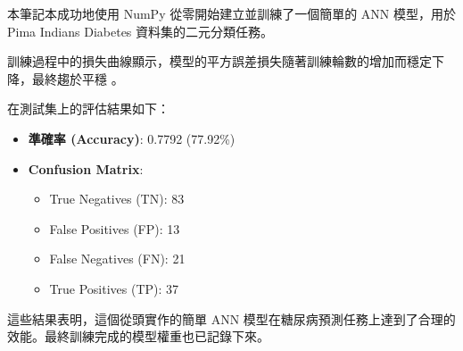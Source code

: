 \documentclass[11pt]{article}
\providecommand{\tightlist}{%
      \setlength{\itemsep}{0pt}\setlength{\parskip}{0pt}}
\begin{document}
本筆記本成功地使用 NumPy 從零開始建立並訓練了一個簡單的 ANN 模型，用於
Pima Indians Diabetes 資料集的二元分類任務。

訓練過程中的損失曲線顯示，模型的平方誤差損失隨著訓練輪數的增加而穩定下降，最終趨於平穩
。

在測試集上的評估結果如下：

\begin{itemize}
\tightlist
\item
  \textbf{準確率 (Accuracy)}: 0.7792 (77.92\%)
\item
  \textbf{Confusion Matrix}:

  \begin{itemize}
  \tightlist
  \item
    True Negatives (TN): 83
  \item
    False Positives (FP): 13
  \item
    False Negatives (FN): 21
  \item
    True Positives (TP): 37
  \end{itemize}
\end{itemize}

這些結果表明，這個從頭實作的簡單 ANN
模型在糖尿病預測任務上達到了合理的效能。最終訓練完成的模型權重也已記錄下來。


    
    
    
\end{document}
